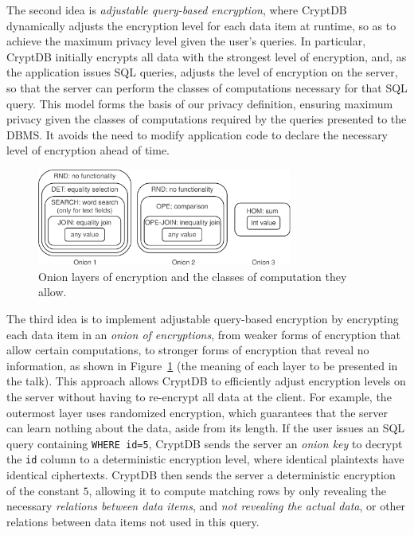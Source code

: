 The second idea is {\em adjustable query-based encryption}, where
CryptDB dynamically adjusts the encryption level for each data item at
runtime, so as to achieve the maximum privacy level given the user's
queries.  In particular, CryptDB initially encrypts all data with the
strongest level of encryption, and, as the application issues SQL
queries, adjusts the level of encryption on the server, so that the
server can perform the classes of computations necessary for that SQL
query.  This model forms the basis of our privacy definition, ensuring
maximum privacy given the classes of computations required by the
queries presented to the DBMS.  It avoids the need to modify
application code to declare the necessary level of encryption ahead of
time.

\begin{figure}[t!] \centering \includegraphics[width=3.3in]{storage.pdf}
  \caption{Onion layers of encryption and the classes of computation
    they allow.}
\label{fig:onion}
\end{figure}

The third idea is to implement adjustable query-based encryption by
encrypting each data item in an {\em onion of encryptions}, from
weaker forms of encryption that allow certain computations, to
stronger forms of encryption that reveal no information, as shown in
Figure~\ref{fig:onion} (the meaning of each layer to be presented in the talk). 
This approach allows CryptDB to efficiently adjust encryption levels on the server without having to re-encrypt
all data at the client.  For example, the outermost layer uses
randomized encryption, which guarantees that the server can learn
nothing about the data, aside from its length.  If the user issues an
SQL query containing {\tt WHERE id=5}, CryptDB sends the server an
{\em onion key} to decrypt the {\tt id} column to a deterministic
encryption level, where identical plaintexts have identical
ciphertexts. CryptDB then sends the server a deterministic encryption
of the constant $5$, allowing it to compute matching rows by only
revealing the necessary {\em relations between data items}, and {\em
  not revealing the actual data}, or other relations between data
items not used in this query.

